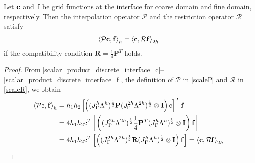 {{ \begin{lemma}\label{lemma1}
 	Let ${\bf c}$ and ${\bf f}$ be grid functions at the interface for coarse domain and fine domain, respectively. Then the interpolation operator $\mathcal{P}$ and the restriction operator $\mathcal{R}$ satisfy
 	\begin{equation}\label{pr_relation}
 	\left<\mathcal{P} {\bf c}, {\bf f}\right>_h = \left<{\bf c}, \mathcal{R}{\bf f}\right>_{2h}
 	\end{equation}
 	if the compatibility condition $\bm{R} = \frac{1}{4}\bm{P}^T$ holds. 
 \end{lemma}
 \begin{proof}
 	From \eqref{scalar_product_discrete_interface_c}--\eqref{scalar_product_discrete_interface_f}, the definition of $\mathcal{P}$ in \eqref{scaleP} and $\mathcal{R}$ in \eqref{scaleR}, we obtain
 	\begin{align*}
 	\left<\mathcal{P}{\bf c}, {\bf f}\right>_h &= h_1h_2\left[\left((J_{\Gamma}^h\Lambda^h)^{\frac{1}{2}} {\bf P}(J_{\Gamma}^{2h}\Lambda^{2h})^{\frac{1}{2}}\otimes {\bf I}\right){\bf c}\right]^T{\bf f}\\
 	& = 4h_1h_2 {\bf c}^T  \left[\left((J_{\Gamma}^{2h}\Lambda^{2h})^{\frac{1}{2}}\frac{1}{4}{\bf P}^T(J_{\Gamma}^h\Lambda^h)^{\frac{1}{2}}\otimes {\bf I}\right) {\bf f}\right]\\
 	& =4h_1h_2 {\bf c}^T  \left[\left((J_{\Gamma}^{2h}\Lambda^{2h})^{\frac{1}{2}}{\bf R}(J_{\Gamma}^h\Lambda^h)^{\frac{1}{2}}\otimes {\bf I}\right) {\bf f}\right] = \left<{\bf c}, \mathcal{R}{\bf f}\right>_{2h}
 	\end{align*}
 \end{proof}
 

}}
